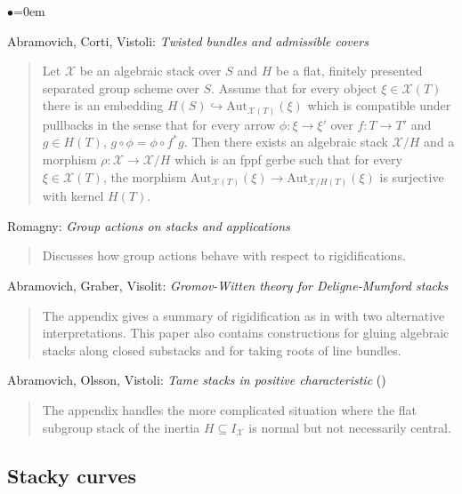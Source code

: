 \begin{list}{$\bullet$}{\leftmargin=0em}
\item Abramovich, Corti, Vistoli:
\emph{Twisted bundles and admissible covers} \cite{acv}
\begin{quote}
Let $\mathcal{X}$ be an algebraic stack over $S$ and $H$ be a flat, finitely
presented separated group scheme over $S$.  Assume that for every object
$\xi \in \mathcal{X}(T)$ there is an embedding
$H(S) \hookrightarrow \text{Aut}_{\mathcal{X}(T)}(\xi)$ which is compatible
under pullbacks in the sense that for every arrow $\phi: \xi \rightarrow \xi'$
over $f: T \rightarrow T'$ and $g \in H(T)$, $g \circ \phi = \phi \circ f^*g$.
Then there exists an algebraic stack $\mathcal{X}/H$ and a
morphism $\rho: \mathcal{X} \rightarrow \mathcal{X}/H$ which is
an fppf gerbe such that for every $\xi \in \mathcal{X}(T)$, the morphism
$\text{Aut}_{\mathcal{X}(T)} (\xi)
\rightarrow \text{Aut}_{\mathcal{X}/H (T)} (\xi) $
is surjective with kernel $H(T)$.
\end{quote}
\smallskip

\item Romagny:  \emph{Group actions on stacks and applications}
\cite{romagny_actions}
\begin{quote}
Discusses how group actions behave with respect to rigidifications.
\end{quote}
\smallskip

\item Abramovich, Graber, Visolit:
\emph{Gromov-Witten theory for Deligne-Mumford stacks} \cite{agv}
\begin{quote}
The appendix gives a summary of rigidification as in \cite{acv} with two
alternative interpretations.  This paper also contains constructions for
gluing algebraic stacks along closed substacks and for taking roots of line
bundles.
\end{quote}
\smallskip

\item
Abramovich, Olsson, Vistoli: \emph{Tame stacks in positive characteristic}
(\cite{tame})
\begin{quote}
The appendix handles the more complicated situation where the flat subgroup
stack of the inertia $H \subseteq I_{\mathcal{X}}$ is normal but not
necessarily central.
\end{quote}
\end{list}

\subsection{Stacky curves}
\label{subsection-stacky-curves}

